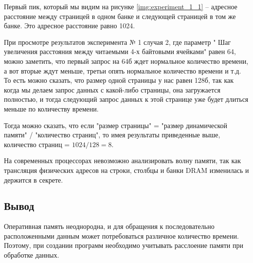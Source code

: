 Первый пик, который мы видим на рисунке \ref{img:experiment_1_1} -- адресное расстояние между страницей в одном банке и следующей страницей в том же банке. Это адресное расстояние равно 1024.

При просмотре результатов эксперимента № 1 случая 2, где параметр " Шаг увеличения расстояния между читаемыми 4-х байтовыми ячейками" равен 64, можно заметить, что первый запрос на 64б ждет нормальное количество времени, а вот вторые ждут меньше, третьи опять нормальное количество времени и т.д. То есть можно сказать, что размер одной страницы у нас равен 128б, так как когда мы делаем запрос данных с какой-либо страницы, она загружается полностью, и тогда следующий запрос данных к этой странице уже будет длиться меньше по количеству времени. 

Тогда можно сказать, что если "размер страницы" = "размер динамической памяти" / "количество страниц", то имея результаты приведенные выше, количество страниц = $1024 / 128 = 8$.

На современных процессорах невозможно анализировать волну памяти, так как трансляция физических адресов на строки, столбцы и банки DRAM изменилась и держится в секрете.

\subsection*{\textbf{Вывод}}
Оперативная память неоднородна, и для обращения к последовательно расположенными данным может потребоваться различное количество времени. Поэтому, при создании программ необходимо учитывать расслоение памяти при обработке данных.